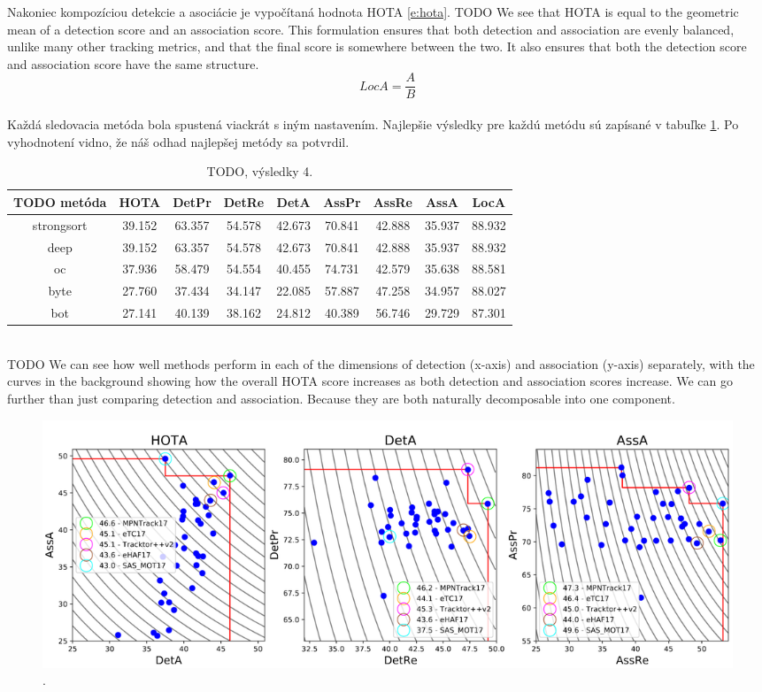 Nakoniec kompozíciou detekcie a asociácie je vypočítaná hodnota HOTA \ref{e:hota}. TODO We see that HOTA is equal to the geometric mean of a detection score and an association score. This formulation ensures that both detection and association are evenly balanced, unlike many other tracking metrics, and that the final score is somewhere between the two. It also ensures that both the detection score and association score have the same structure.
\begingroup
\large
\begin{equation}
LocA = \frac{A}{B}
\label{e:hota}
\end{equation}
\endgroup
\\
Každá sledovacia metóda bola spustená viackrát s iným nastavením. Najlepšie výsledky pre každú metódu sú zapísané v tabuľke \ref{table:hota1}. Po vyhodnotení vidno, že náš odhad najlepšej metódy sa potvrdil.
\\
\begin{table}[ht]
\centering
\begin{tabular}{|c c c c c c c c c|} 
 \hline
TODO metóda & HOTA & DetPr & DetRe & DetA & AssPr & AssRe & AssA & LocA \\ [0.5ex] 
 \hline
strongsort & 39.152 & 63.357 & 54.578 & 42.673 & 70.841 & 42.888 & 35.937 & 88.932 \\ [0.1ex]
deep & 39.152 & 63.357 & 54.578 & 42.673 & 70.841 & 42.888 & 35.937 & 88.932 \\ [0.1ex]
oc & 37.936 & 58.479 & 54.554 & 40.455 & 74.731 & 42.579 & 35.638 & 88.581 \\ [0.1ex]
byte & 27.760 & 37.434 & 34.147 & 22.085 & 57.887 & 47.258 & 34.957 & 88.027 \\ [0.1ex]
bot & 27.141 & 40.139 & 38.162 & 24.812 & 40.389 & 56.746 & 29.729 & 87.301 \\ [0.1ex]
 \hline
\end{tabular}
\caption{TODO, výsledky 4.}
\label{table:hota1}
\end{table}
\\
TODO We can see how well methods perform in each of the dimensions of detection (x-axis) and association (y-axis) separately, with the curves in the background showing how the overall HOTA score increases as both detection and association scores increase. We can go further than just comparing detection and association. Because they are both naturally decomposable into one component.
\begin{figure}[ht]
    \centering
    \includegraphics[width=1\textwidth]{images/T/compare.png}
    \caption{.}
    \label{img:road}
\end{figure}

